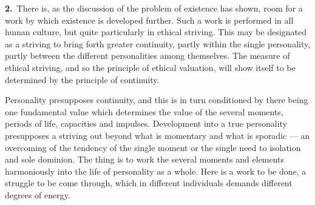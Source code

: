 \documentclass[12pt,a4paper]{book}
\begin{document}
\noindent\textbf{2.}~There is, as the discussion of the problem of existence has
shown, room for a work by which existence is developed further. Such a work is
performed in all human culture, but quite particularly in ethical striving. This
may be designated as a striving to bring forth greater continuity, partly within
the single personality, partly between the different personalities among
themselves. The measure of ethical striving, and so the principle of ethical
valuation, will show itself to be determined by the principle of continuity.

Personality presupposes continuity, and this is in turn conditioned by there
being one fundamental value which determines the value of the several moments,
periods of life, capacities and impulses. Development into a true personality
presupposes a striving out beyond what is momentary and what is sporadic --- an
overcoming of the tendency of the single moment or the single need to isolation
and sole dominion. The thing is to work the several moments and elements
harmoniously into the life of personality as a whole. Here is a work to be done,
a struggle to be come through, which in different individuals demands different
degrees of energy.
\end{document}
